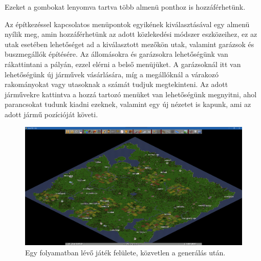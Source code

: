 Ezeket a gombokat lenyomva tartva több almenü ponthoz is hozzáférhetünk.

Az építkezéssel kapcsolatos menüpontok egyikének kiválasztásával egy almenü nyílik meg, amin hozzáférhetünk az adott közlekedési módszer eszközeihez, ez az utak esetében lehetőséget ad a kiválasztott mezőkön utak, valamint garázsok és buszmegállók építésére. Az állomásokra és garázsokra lehetőségünk van rákattintani a pályán, ezzel elérni a belső menüjüket. A garázsoknál itt van lehetőségünk új járművek vásárlására, míg a megállóknál a várakozó rakományokat vagy utasoknak a számát tudjuk megtekinteni. Az adott járművekre kattintva a hozzá tartozó menüket van lehetőségünk megnyitni, ahol parancsokat tudunk kiadni ezeknek, valamint egy új nézetet is kapunk, ami az adott jármű pozícióját követi.

\begin{figure}
	\centering
	\includegraphics[width=\textwidth]{images/palya.png}
	\caption{Egy folyamatban lévő játék felülete, közvetlen a generálás után.}
	\label{fig:palya}
\end{figure}

